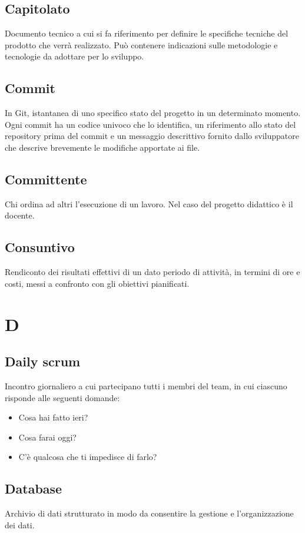     \subsection{Capitolato}
    Documento tecnico a cui si fa riferimento per definire le specifiche tecniche 
    del prodotto che verrà realizzato. Può contenere indicazioni sulle metodologie e
    tecnologie da adottare per lo sviluppo.
    \subsection{Commit}
    In Git, istantanea di uno specifico stato del progetto in un determinato momento.
    Ogni commit ha un codice univoco che lo identifica, un riferimento allo stato del 
    repository prima del commit e un messaggio descrittivo fornito dallo sviluppatore 
    che descrive brevemente le modifiche apportate ai file.
    \subsection{Committente}
    Chi ordina ad altri l'esecuzione di un lavoro. Nel caso del progetto didattico
    è il docente.
    \subsection{Consuntivo}
    Rendiconto dei risultati effettivi di un dato periodo di attività, 
    in termini di ore e costi, messi a confronto con gli obiettivi pianificati.
\pagebreak
\section{D}
    \subsection{Daily scrum}
    Incontro giornaliero a cui partecipano tutti i membri del team, in cui ciascuno
    risponde alle seguenti domande:
    \begin{itemize}
        \item Cosa hai fatto ieri?
        \item Cosa farai oggi?
        \item C'è qualcosa che ti impedisce di farlo?
    \end{itemize}
    \subsection{Database}
    Archivio di dati strutturato in modo da consentire la gestione e 
    l'organizzazione dei dati.
